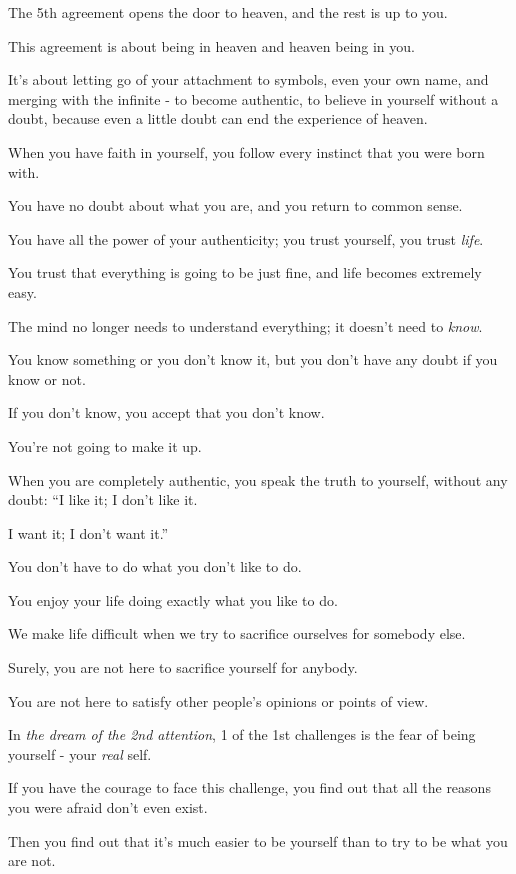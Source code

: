 \documentclass{article}
\numberwithin{equation}{section}
\begin{document}
The 5th agreement opens the door to heaven, and the rest is up to you.

This agreement is about being in heaven and heaven being in you.

It's about letting go of your attachment to symbols, even your own name, and merging with the infinite - to become authentic, to believe in yourself without a doubt, because even a little doubt can end the experience of heaven.

%
When you have faith in yourself, you follow every instinct that you were born with.

You have no doubt about what you are, and you return to common sense.

You have all the power of your authenticity; you trust yourself, you trust \textit{life}.

You trust that everything is going to be just fine, and life becomes extremely easy.

The mind no longer needs to understand everything; it doesn't need to \textit{know}.

You know something or you don't know it, but you don't have any doubt if you know or not.

If you don't know, you accept that you don't know.

You're not going to make it up.

When you are completely authentic, you speak the truth to yourself, without any doubt: ``I like it; I don't like it.

I want it; I don't want it.''

You don't have to do what you don't like to do.

You enjoy your life doing exactly what you like to do.

%
We make life difficult when we try to sacrifice ourselves for somebody else.

Surely, you are not here to sacrifice yourself for anybody.

You are not here to satisfy other people's opinions or points of view.

In \textit{the dream of the 2nd attention}, 1 of the 1st challenges is the fear of being yourself - your \textit{real} self.

If you have the courage to face this challenge, you find out that all the reasons you were afraid don't even exist.

Then you find out that it's much easier to be yourself than to try to be what you are not.
\end{document}
